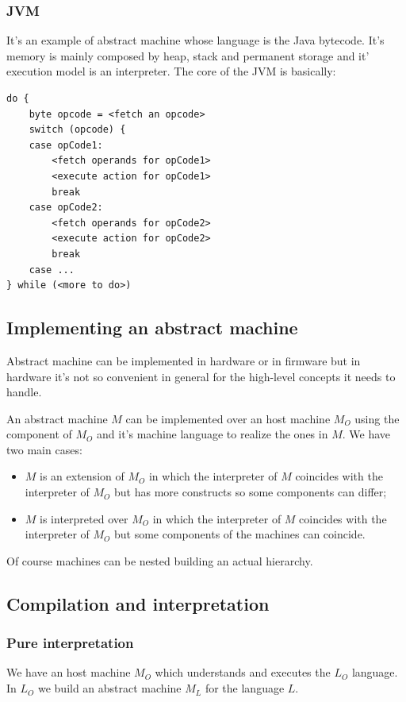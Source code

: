 \subsubsection{JVM}
It's an example of abstract machine whose language is the Java bytecode.
It's memory is mainly composed by heap, stack and permanent storage and it' execution model is an interpreter.
The core of the JVM is basically:
\begin{verbatim}
do {
    byte opcode = <fetch an opcode>
    switch (opcode) {
    case opCode1:
        <fetch operands for opCode1>
        <execute action for opCode1>
        break
    case opCode2:
        <fetch operands for opCode2>
        <execute action for opCode2>
        break
    case ...
} while (<more to do>)
\end{verbatim}


\subsection{Implementing an abstract machine}
Abstract machine can be implemented in hardware or in firmware but in hardware it's not so convenient in general for the high-level concepts it needs to handle.

An abstract machine $M$ can be implemented over an host machine $M_O$ using the component of $M_O$ and it's machine language to realize the ones in $M$.
We have two main cases:
\begin{itemize}
    \item $M$ is an extension of $M_O$ in which the interpreter of $M$ coincides with the interpreter of $M_O$ but has more constructs so some components can differ;
    \item $M$ is interpreted over $M_O$ in which the interpreter of $M$ coincides with the interpreter of $M_O$ but some components of the machines can coincide.
\end{itemize}

Of course machines can be nested building an actual hierarchy.

\subsection{Compilation and interpretation}
\subsubsection{Pure interpretation}
We have an host machine $M_O$ which understands and executes the $L_O$ language.
In $L_O$ we build an abstract machine $M_L$ for the language $L$.

